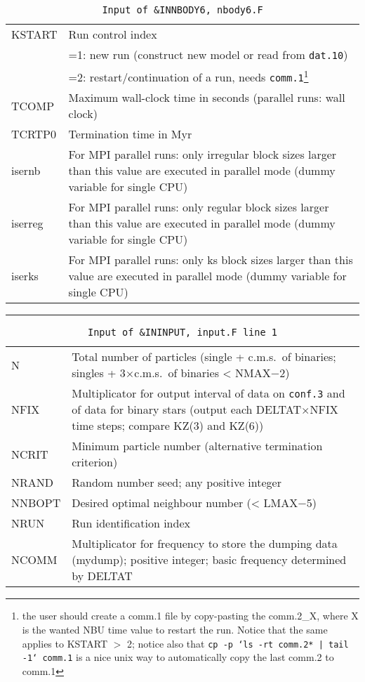 
\vspace{0.2cm}
\noindent
\begin{longtable}{@{}p{1.5cm}p{13.0cm}}
\caption{\texttt{Input of \&INNBODY6, nbody6.F}}
\label{table:innbody6}\\\hline
%
KSTART  & Run control index\\
        & =1: new run (construct new model or read from \texttt{dat.10}) \\
        & =2: restart/continuation of a run, needs \texttt{comm.1}\footnote{the user should create a comm.1 file by copy-pasting the comm.2\_X, where X is the wanted NBU time value to restart the run. Notice that the same applies to KSTART $>$ 2; notice also that \\
        \texttt{cp -p `ls -rt comm.2* | tail -1` comm.1} \\
        is a nice unix way to automatically copy the last comm.2 to comm.1 }\\
%
TCOMP   & Maximum wall-clock time in seconds (parallel runs: wall clock)\\
%
TCRTP0  & Termination time in Myr \\
%
isernb  & For MPI parallel runs: only irregular block sizes larger than
          this value are executed in parallel mode
          (dummy variable for single CPU) \\
iserreg & For MPI parallel runs: only regular block sizes larger than
          this value are executed in parallel mode
          (dummy variable for single CPU) \\
iserks  & For MPI parallel runs: only ks block sizes larger than this value
           are executed in parallel mode 
          (dummy variable for single CPU) \\

\end{longtable}

\hrule
\noindent
\begin{longtable}{@{}p{1.5cm}p{13.0cm}}
\caption{\texttt{Input of \&ININPUT, input.F line 1}}
\label{table:ininput1}\\\hline
%
N       & Total number of particles (single + c.m.s.~of binaries;
          singles + 3$\times$c.m.s.~of binaries < NMAX$-$2)\\
NFIX    & Multiplicator for output interval of data on \texttt{conf.3} and
          of data for binary stars (output each DELTAT$\times$NFIX time steps; compare KZ(3) and KZ(6))\\
NCRIT   & Minimum particle number (alternative termination criterion) \\
NRAND   & Random number seed; any positive integer \\
NNBOPT  & Desired optimal neighbour number (< LMAX$-$5)\\ %
NRUN    & Run identification index\\
NCOMM   & Multiplicator for frequency to store the dumping data (mydump); positive integer; basic frequency determined by DELTAT \\
\end{longtable}

